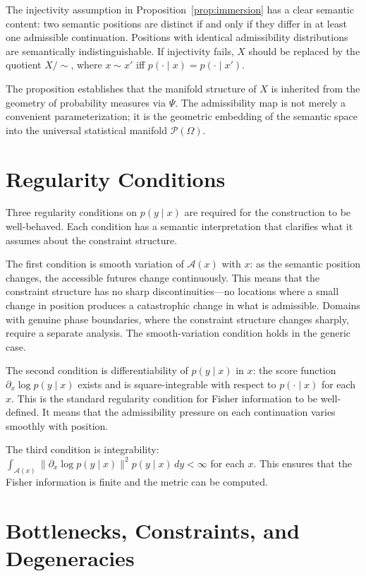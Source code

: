 \documentclass[12pt, oneside]{book}
\theoremstyle{plain-flyxion}
\theoremstyle{definition-flyxion}
\newcommand{\A}{\mathcal{A}}
\begin{document}
The injectivity assumption in Proposition~\ref{prop:immersion} has a clear semantic
content: two semantic positions are distinct if and only if they differ in at least one
admissible continuation. Positions with identical admissibility distributions are
semantically indistinguishable. If injectivity fails, $X$ should be replaced by the
quotient $X / {\sim}$, where $x \sim x'$ iff $p(\cdot \mid x) = p(\cdot \mid x')$.

The proposition establishes that the manifold structure of $X$ is inherited from the
geometry of probability measures via $\Psi$. The admissibility map is not merely a
convenient parameterization; it is the geometric embedding of the semantic space into the
universal statistical manifold $\mathcal{P}(\Omega)$.

\section{Regularity Conditions}

Three regularity conditions on $p(y\mid x)$ are required for the construction to be
well-behaved. Each condition has a semantic interpretation that clarifies what it assumes
about the constraint structure.

The first condition is smooth variation of $\A(x)$ with $x$: as the semantic position
changes, the accessible futures change continuously. This means that the constraint
structure has no sharp discontinuities---no locations where a small change in position
produces a catastrophic change in what is admissible. Domains with genuine phase
boundaries, where the constraint structure changes sharply, require a separate analysis.
The smooth-variation condition holds in the generic case.

The second condition is differentiability of $p(y\mid x)$ in $x$: the score function
$\partial_x \log p(y\mid x)$ exists and is square-integrable with respect to $p(\cdot\mid
x)$ for each $x$. This is the standard regularity condition for Fisher information to be
well-defined. It means that the admissibility pressure on each continuation varies
smoothly with position.

The third condition is integrability: $\int_{\A(x)} \|\partial_x \log p(y\mid x)\|^2
p(y\mid x)\, dy < \infty$ for each $x$. This ensures that the Fisher information is finite
and the metric can be computed.

\section{Bottlenecks, Constraints, and Degeneracies}
\end{document}
